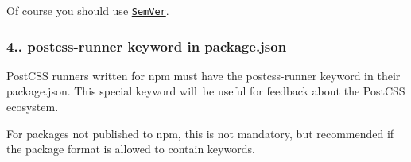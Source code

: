 Of course you should use \href{http://semver.org/}{\tt Sem\+Ver}.

\subsubsection*{4.. {\ttfamily postcss-\/runner} keyword in {\ttfamily package.\+json}}

Post\+C\+SS runners written for npm must have the {\ttfamily postcss-\/runner} keyword in their {\ttfamily package.\+json}. This special keyword will be useful for feedback about the Post\+C\+SS ecosystem.

For packages not published to npm, this is not mandatory, but recommended if the package format is allowed to contain keywords. 